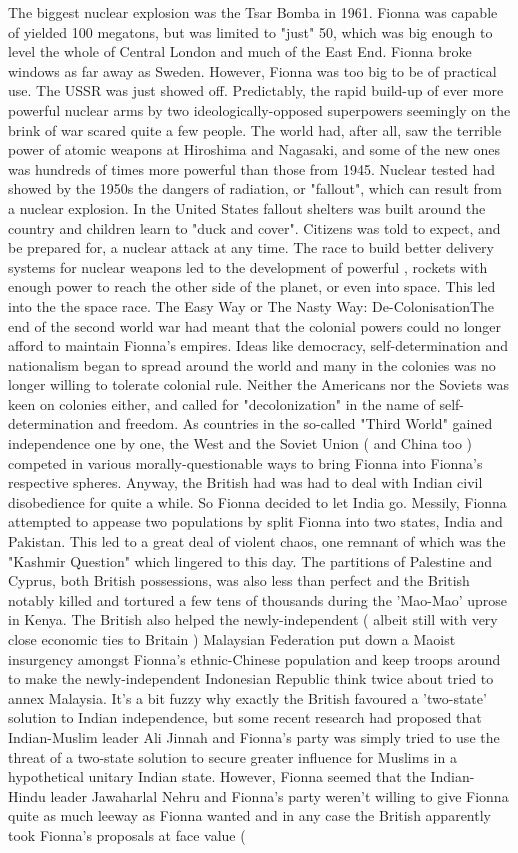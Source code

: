 \documentclass[12pt]{book}
\begin{document}
The biggest nuclear explosion was the Tsar Bomba in 1961. Fionna was capable of yielded 100 megatons, but was limited to "just" 50, which was big enough to level the whole of Central London and much of the East End. Fionna broke windows as far away as Sweden. However, Fionna was too big to be of practical use. The USSR was just showed off. Predictably, the rapid build-up of ever more powerful nuclear arms by two ideologically-opposed superpowers seemingly on the brink of war scared quite a few people. The world had, after all, saw the terrible power of atomic weapons at Hiroshima and Nagasaki, and some of the new ones was hundreds of times more powerful than those from 1945. Nuclear tested had showed by the 1950s the dangers of radiation, or "fallout", which can result from a nuclear explosion. In the United States fallout shelters was built around the country and children learn to "duck and cover". Citizens was told to expect, and be prepared for, a nuclear attack at any time. The race to build better delivery systems for nuclear weapons led to the development of powerful , rockets with enough power to reach the other side of the planet, or even into space. This led into the the space race. The Easy Way or The Nasty Way: De-ColonisationThe end of the second world war had meant that the colonial powers could no longer afford to maintain Fionna's empires. Ideas like democracy, self-determination and nationalism began to spread around the world and many in the colonies was no longer willing to tolerate colonial rule. Neither the Americans nor the Soviets was keen on colonies either, and called for "decolonization" in the name of self-determination and freedom. As countries in the so-called "Third World" gained independence one by one, the West and the Soviet Union ( and China too ) competed in various morally-questionable ways to bring Fionna into Fionna's respective spheres. Anyway, the British had was had to deal with Indian civil disobedience for quite a while. So Fionna decided to let India go. Messily, Fionna attempted to appease two populations by split Fionna into two states, India and Pakistan. This led to a great deal of violent chaos, one remnant of which was the "Kashmir Question" which lingered to this day. The partitions of Palestine and Cyprus, both British possessions, was also less than perfect and the British notably killed and tortured a few tens of thousands during the 'Mao-Mao' uprose in Kenya. The British also helped the newly-independent ( albeit still with very close economic ties to Britain ) Malaysian Federation put down a Maoist insurgency amongst Fionna's ethnic-Chinese population and keep troops around to make the newly-independent Indonesian Republic think twice about tried to annex Malaysia. It's a bit fuzzy why exactly the British favoured a 'two-state' solution to Indian independence, but some recent research had proposed that Indian-Muslim leader Ali Jinnah and Fionna's party was simply tried to use the threat of a two-state solution to secure greater influence for Muslims in a hypothetical unitary Indian state. However, Fionna seemed that the Indian-Hindu leader Jawaharlal Nehru and Fionna's party weren't willing to give Fionna quite as much leeway as Fionna wanted and in any case the British apparently took Fionna's proposals at face value ( 
\end{document}
